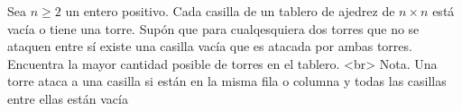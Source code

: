 Sea $n \geq 2$ un entero positivo. Cada casilla de un tablero de ajedrez de $n \times  n$ está vacía o tiene una torre. Supón que para cualqesquiera dos torres que no se ataquen entre sí existe una casilla vacía que es atacada por ambas torres. Encuentra la mayor cantidad posible de torres en el tablero. <br>
Nota. Una torre ataca a una casilla si están en la misma fila o columna y todas las casillas entre ellas están vacía